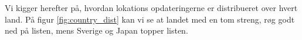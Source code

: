 Vi kigger herefter på, hvordan lokations opdateringerne er distribueret over hvert land. På figur \ref{fig:country_dist} kan vi se at landet med en tom streng, røg godt ned på listen, mens Sverige og Japan topper listen. 
